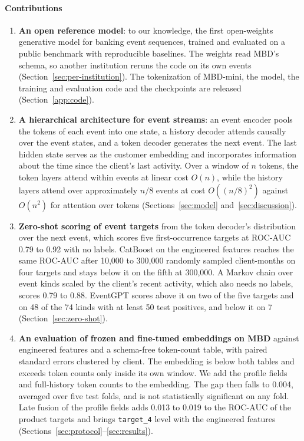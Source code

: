 \documentclass[12pt]{article}
\newcommand{\tok}[1]{\texttt{#1}}
\begin{document}
\paragraph{Contributions}
\begin{enumerate}
\item \textbf{An open reference model}: to our knowledge, the first open-weights generative model for banking event sequences, trained and evaluated on a public benchmark with reproducible baselines. The weights read MBD's schema, so another institution reruns the code on its own events (Section~\ref{sec:per-institution}). The tokenization of MBD-mini, the model, the training and evaluation code and the checkpoints are released (Section~\ref{app:code}).
\item \textbf{A hierarchical architecture for event streams}: an event encoder pools the tokens of each event into one state, a history decoder attends causally over the event states, and a token decoder generates the next event. The last hidden state serves as the customer embedding and incorporates information about the time since the client's last activity. Over a window of $n$ tokens, the token layers attend within events at linear cost $O(n)$, while the history layers attend over approximately $n/8$ events at cost $O((n/8)^2)$ against $O(n^2)$ for attention over tokens (Sections~\ref{sec:model} and~\ref{sec:discussion}).
\item \textbf{Zero-shot scoring of event targets} from the token decoder's distribution over the next event, which scores five first-occurrence targets at ROC-AUC 0.79 to 0.92 with no labels. CatBoost on the engineered features reaches the same ROC-AUC after 10,000 to 300,000 randomly sampled client-months on four targets and stays below it on the fifth at 300,000. A Markov chain over event kinds scaled by the client's recent activity, which also needs no labels, scores 0.79 to 0.88. EventGPT scores above it on two of the five targets and on 48 of the 74 kinds with at least 50 test positives, and below it on 7 (Section~\ref{sec:zero-shot}).
\item \textbf{An evaluation of frozen and fine-tuned embeddings on MBD} against engineered features and a schema-free token-count table, with paired standard errors clustered by client. The embedding is below both tables and exceeds token counts only inside its own window. We add the profile fields and full-history token counts to the embedding. The gap then falls to 0.004, averaged over five test folds, and is not statistically significant on any fold. Late fusion of the profile fields adds 0.013 to 0.019 to the ROC-AUC of the product targets and brings \tok{target\_4} level with the engineered features (Sections~\ref{sec:protocol}--\ref{sec:results}).

\end{enumerate}
\end{document}
